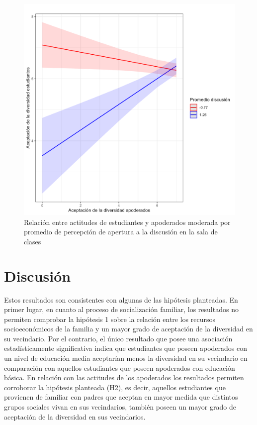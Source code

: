 \documentclass[12pt,twoside]{templates/facsothesis}
\begin{document}
\begin{figure}[!ht]

{\centering \includegraphics[width=1\linewidth,]{IPO/output/graphs/interac} 

}

\caption{Relación entre actitudes de estudiantes y apoderados moderada por promedio de percepción de apertura a la discusión en la sala de clases}\label{fig:graph-interact}
\end{figure}

\hypertarget{discusiuxf3n}{%
\chapter{Discusión}\label{discusiuxf3n}}

Estos resultados son consistentes con algunas de las hipótesis planteadas. En primer lugar, en cuanto al proceso de socialización familiar, los resultados no permiten comprobar la hipótesis 1 sobre la relación entre los recursos socioeconómicos de la familia y un mayor grado de aceptación de la diversidad en su vecindario. Por el contrario, el único resultado que posee una asociación estadísticamente significativa indica que estudiantes que poseen apoderados con un nivel de educación media aceptarían menos la diversidad en su vecindario en comparación con aquellos estudiantes que poseen apoderados con educación básica. En relación con las actitudes de los apoderados los resultados permiten corroborar la hipótesis planteada (H2), es decir, aquellos estudiantes que provienen de familiar con padres que aceptan en mayor medida que distintos grupos sociales vivan en sus vecindarios, también poseen un mayor grado de aceptación de la diversidad en sus vecindarios.
\end{document}
